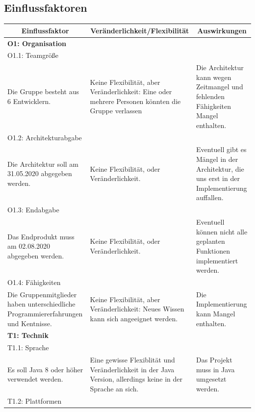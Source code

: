 \documentclass[fontsize=12pt,paper=a4,twoside]{scrartcl}
\begin{document}
\subsection{Einflussfaktoren}

\begin{longtable}[c]{|p{5cm}|p{5cm}|p{5cm}|}
\hline
\multicolumn{1}{|c|}{\textbf{Einflussfaktor}} & \multicolumn{1}{c|}{\textbf{Veränderlichkeit/Flexibilität}} & \multicolumn{1}{c|}{\textbf{Auswirkungen}}  \\ \hline
\endhead
\multicolumn{3}{|l|}{{\textbf{O1: Organisation}}} 
\\ \hline
\multicolumn{3}{|l|}{{O1.1: Teamgröße}} 
\\ \hline
Die Gruppe besteht aus 6 Entwicklern. & Keine Flexibilität, aber Veränderlichkeit: Eine oder mehrere Personen könnten die Gruppe verlassen      &  Die Architektur kann wegen Zeitmangel und fehlenden Fähigkeiten Mangel enthalten.
\\ \hline 
\multicolumn{3}{|l|}{{O1.2: Architekturabgabe}} 
\\ \hline
Die Architektur soll am 31.05.2020 abgegeben werden. & Keine Flexibilität, oder Veränderlichkeit.  & Eventuell gibt es Mängel in der Architektur, die uns erst in der Implementierung auffallen. 
\\ \hline             
\multicolumn{3}{|l|}{{O1.3: Endabgabe}} 
\\ \hline
Das Endprodukt muss am 02.08.2020 abgegeben werden. & Keine Flexibilität, oder Veränderlichkeit.   &  Eventuell können nicht alle geplanten Funktionen implementiert werden.
\\ \hline
\multicolumn{3}{|l|}{{O1.4: Fähigkeiten}} 
\\ \hline
Die Gruppenmitglieder haben unterschiedliche Programmiererfahrungen und Kentnisse. & Keine Flexibilität, aber Veränderlichkeit: Neues Wissen kann sich angeeignet werden.  & Die Implementierung kann Mangel enthalten. 
\\ \hline     
\multicolumn{3}{|l|}{{\textbf{T1: Technik}}} 
\\ \hline 
\multicolumn{3}{|l|}{{T1.1: Sprache}} 
\\ \hline
Es soll Java 8 oder höher verwendet werden. & Eine gewisse Flexiblität und Veränderlichkeit in der Java Version, allerdings keine in der Sprache an sich.  & Das Projekt muss in Java umgesetzt werden. 
\\ \hline                 
\multicolumn{3}{|l|}{{T1.2: Plattformen}} 
\\ \hline

\end{longtable}
\end{document}

